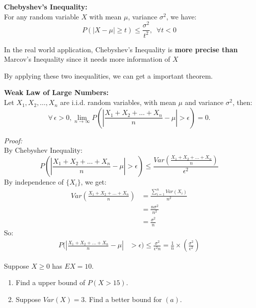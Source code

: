 \documentclass{article}
\begin{document}
\begin{theorem}
    \textbf{Chebyshev's Inequality:}\\
    For any random variable $X$ with mean $\mu$, variance $\sigma^2$, we have:
    \[
        P(|X-\mu| \geq t) \leq \frac{\sigma^2}{t^2}, \,\,\,  \forall t < 0
    \]
\end{theorem}
In the real world application, Chebyshev's Inequality is\textbf{ more precise than }Marcov's  Inequality since it needs more information of $X$


By applying these two inequalities, we can get a important theorem.

\begin{theorem}
    \textbf{Weak Law of Large Numbers:}\\
    Let $X_1,X_2,\dots,X_n$ are i.i.d. random variables, with mean $\mu$ and variance $\sigma^2$, then:
    \[
        \forall\,\epsilon > 0, \lim_{n \rightarrow \infty} P( |\frac{X_1 + X_2 + \dots + X_n}{n} - \mu| > \epsilon) = 0.
    \]
\end{theorem}

\emph{Proof:}\\
By Chebyshev Inequality:
\[
    P( |\frac{X_1 + X_2 + \dots + X_n}{n} - \mu| > \epsilon) \leq \frac{Var(\frac{X_1+X_2+\dots+X_n}{n})}{\epsilon^2}
\]
By independence of $\{X_i\}$, we get:
\begin{align*}
        Var(\frac{X_1+X_2+\dots+X_n}{n})    &= \frac{\sum^n_{i=1}Var(X_i)}{n^2} \\
                                            &= \frac{n\sigma^2}{n^2} \\
                                            &= \frac{\sigma^2}{n}
\end{align*}
So:
\begin{align*}
    P( |\frac{X_1 + X_2 + \dots + X_n}{n} - \mu| &> \epsilon) \leq \frac{\sigma^2}{\epsilon^2n} = \frac{1}{n}\times(\frac{\sigma^2}{\epsilon^2})
\end{align*}



\begin{quiz}
    Suppose $X \geq 0$ has $EX = 10$.
    \begin{enumerate}
        \item Find a upper bound of $P(X > 15)$. 
        \item Suppose $Var(X) = 3$. Find a better bound for $(a)$.
    \end{enumerate}
\end{quiz}
\end{document}
